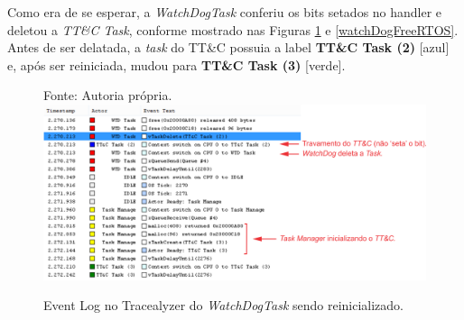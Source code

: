 Como era de se esperar, a \textit{WatchDogTask} conferiu os bits setados no handler e deletou a \textit{TT\&C Task}, conforme mostrado nas Figuras \ref{watchDogFreeRTOS_1} e \ref{watchDogFreeRTOS}. Antes de ser delatada, a \textit{task} do TT\&C possuia a label  \textbf{TT\&C Task (2)} [azul] e, após ser reiniciada, mudou para \textbf{TT\&C Task (3)} [verde].

\begin{figure}[h]
\footnotesize{	
	\centering
			\centering
	\footnotesize{Fonte: Autoria própria.}
	\includegraphics[keepaspectratio=true,scale=0.63]{figuras/watchDogFreeRTOS_3.PNG}
	\caption{Event Log no Tracealyzer do \textit{WatchDogTask} sendo reinicializado.}	
	\label{watchDogFreeRTOS_1}
}
\end{figure}
\FloatBarrier


